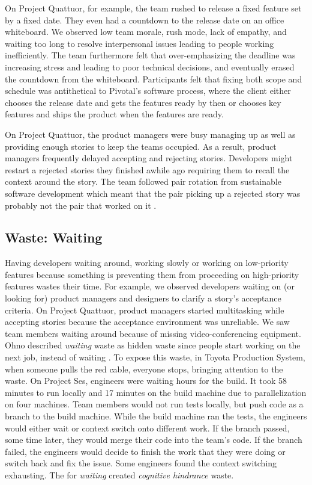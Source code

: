On Project Quattuor, for example, the team rushed to release a fixed feature set by a fixed date. They even had a countdown to the release date on an office whiteboard. We observed low team morale, rush mode, lack of empathy, and waiting too long to resolve interpersonal issues leading to people working inefficiently. The team furthermore felt that over-emphasizing the deadline was increasing stress and leading to poor technical decisions, and eventually erased the countdown from the whiteboard. Participants felt that fixing both scope and schedule was antithetical to Pivotal's software process, where the client either chooses the release date and gets the features ready by then or chooses key features and ships the product when the features are ready. 

On Project Quattuor, the product managers were busy managing up as well as providing enough stories to keep the teams occupied. As a result, product managers frequently delayed accepting and rejecting stories. Developers might restart a rejected stories they finished awhile ago requiring them to recall the context around the story. The team followed pair rotation from sustainable software development \cite{SedanoSustainableSoftware} which meant that the pair picking up a rejected story was probably not the pair that worked on it .

\subsection{Waste: Waiting}
Having developers waiting around, working slowly or working on low-priority features because something is preventing them from proceeding on high-priority features wastes their time. For example, we observed developers waiting on (or looking for) product managers and designers to clarify a story's acceptance criteria. On Project Quattuor, product managers started multitasking while accepting stories because the acceptance environment was unreliable. We saw team members waiting around because of missing video-conferencing equipment. 
Ohno described \textit{waiting} waste as hidden waste since people start working on the next job, instead of waiting \cite{OhnoToyotaProductionSystem}. To expose this waste, in Toyota Production System, when someone pulls the red cable, everyone stops, bringing attention to the waste. On Project Ses, engineers were waiting hours for the build. It took 58 minutes to run locally and 17 minutes on the build machine due to parallelization on four machines. Team members would not run tests locally, but push code as a branch to the build machine. While the build machine ran the tests, the engineers would either wait or context switch onto different work. If the branch passed, some time later, they would merge their code into the team's code. If the branch failed, the engineers would decide to finish the work that they were doing or switch back and fix the issue. Some engineers found the context switching exhausting. The  for \textit{waiting} created \textit{cognitive hindrance} waste.

